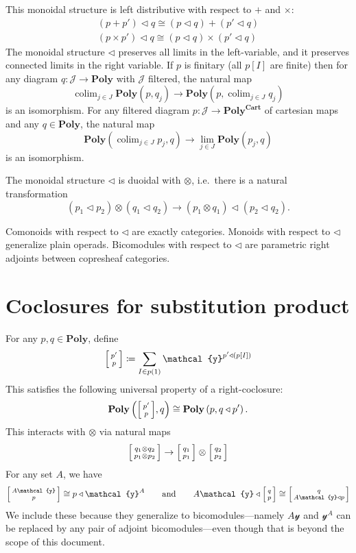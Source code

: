 \documentclass[11pt, one side, article]{memoir}
\makeatletter
\theoremstyle{definition}
\theoremstyle{plain}
\DeclareMathOperator*{\colim}{colim}
\newcommand{\cat}[1]{\mathcal{#1}}%
\newcommand{\Cat}[1]{\mathbf{#1}}%
\newcommand{\too}{\longrightarrow}
\newcommand{\yon}{\mathcal{y}}
\newcommand{\poly}{\Cat{Poly}}
\newcommand{\polycart}{\poly^{\Cat{Cart}}}
\newcommand{\0}{\textsf{0}}
\newcommand{\1}{\tn{\textsf{1}}}
\newcommand{\tri}{\mathbin{\triangleleft}}
\newcommand{\bigcocl}[2]{
     \begin{bmatrix}{\vphantom{f_f^f}#2} \\ {\vphantom{f_f^f}#1} \end{bmatrix}
}
\newcommand{\littlecocl}[2]{
     \begin{bsmallmatrix}{\vphantom{f}#2} \\ {\vphantom{f}#1} \end{bsmallmatrix}
}
\newcommand{\cocr}[2]{
  \relax\if@display
     \bigcocl{#1}{#2}
  \else
     \littlecocl{#1}{#2}
  \fi
}
\newcommand{\qqand}{\qquad\text{and}\qquad}
\makeatother
\begin{document}
This monoidal structure is left distributive with respect to $+$ and $\times$:
\begin{align*}
	(p+p')\tri q\cong (p\tri q)+(p'\tri q)\\
	(p\times p')\tri q\cong (p\tri q)\times(p'\tri q)
\end{align*}
The monoidal structure $\tri$ preserves all limits in the left-variable, and it preserves connected limits in the right variable. If $p$ is finitary (all $p[I]$ are finite) then for any diagram $q\colon \cat{J}\to\poly$ with $\cat{J}$ filtered, the natural map
\begin{equation}
\colim_{j\in J}\poly(p,q_j)\to\poly(p,\colim_{j\in J}q_j)
\end{equation}
is an isomorphism. For any filtered diagram $p\colon\cat{J}\to\polycart$ of cartesian maps and any $q\in\poly$, the natural map
\begin{equation}
\poly(\colim_{j\in J}p_j,q)\to\lim_{j\in J}\poly(p_j,q)
\end{equation}
is an isomorphism.

The monoidal structure $\tri$ is duoidal with $\otimes$, i.e.\ there is a natural transformation
\begin{equation}
	(p_1\tri p_2)\otimes(q_1\tri q_2)\too(p_1\otimes q_1)\tri(p_2\tri q_2).
\end{equation}

Comonoids with respect to $\tri$ are exactly categories. Monoids with respect to $\tri$ generalize plain operads. Bicomodules with respect to $\tri$ are parametric right adjoints between copresheaf categories.


\chapter{Coclosures for substitution product}

For any $p,q\in\poly$, define
\begin{equation}
\cocr{p}{p'}\coloneqq\sum_{I\in p(1)}\yon^{p'\tri (p[I])}
\end{equation}
This satisfies the following universal property of a right-coclosure:
\begin{equation}
	\poly\left(\cocr{p}{p'},q\right)\cong\poly\left(p,q\tri p'\right).
\end{equation}
This interacts with $\otimes$ via natural maps
\begin{equation}
	\cocr{p_1\otimes p_2}{q_1\otimes q_2}\to\cocr{p_1}{q_1}\otimes\cocr{p_2}{q_2}
\end{equation}
For any set $A$, we have
\begin{equation}
  \cocr{p}{A\yon}\cong p\tri\yon^A
  \qqand
  A\yon\tri\cocr{p}{q}\cong\cocr{A\yon\tri p}{q}
\end{equation}
We include these because they generalize to bicomodules---namely $A\yon$ and $\yon^A$ can be replaced by any pair of adjoint bicomodules---even though that is beyond the scope of this document.
\end{document}
